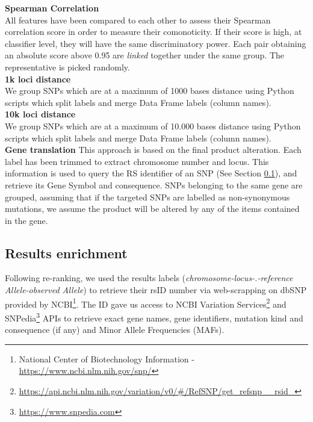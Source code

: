 \textbf{Spearman Correlation}\\
All features have been compared to each other to assess their Spearman correlation score in order to measure their comonoticity. If their score is high, at classifier level, they will have the same discriminatory power. Each pair obtaining an absolute score above 0.95 are \emph{linked} together under the same group. The representative is picked randomly.
\\

\textbf{1k loci distance}\\
We group SNPs which are at a maximum of 1000 bases distance using Python scripts which split labels and merge Data Frame labels (column names).
\\

\textbf{10k loci distance}\\
We group SNPs which are at a maximum of 10.000 bases distance using Python scripts which split labels and merge Data Frame labels (column names).
\\

\textbf{Gene translation}
This approach is based on the final product alteration. Each label has been trimmed to extract chromosome number and locus. This information is used to query the RS identifier of an SNP (See Section \ref{section:rsid}), and retrieve its Gene Symbol and consequence. SNPs belonging to the same gene are grouped, assuming that if the targeted SNPs are labelled as non-synonymous mutations, we assume the product will be altered by any of the items contained in the gene.
\\

\subsection{Results enrichment}
\label{section:rsid}
Following re-ranking, we used the results labels (\emph{chromosome-locus-.-reference Allele-observed Allele}) to retrieve their rsID number via web-scrapping on dbSNP provided by NCBI\footnote{National Center of Biotechnology Information - \url{https://www.ncbi.nlm.nih.gov/snp/}}. The ID gave us access to NCBI Variation Services\footnote{\url{https://api.ncbi.nlm.nih.gov/variation/v0/#/RefSNP/get_refsnp__rsid_}} and SNPedia\footnote{\url{https://www.snpedia.com}} APIs to retrieve exact gene names, gene identifiers, mutation kind and consequence (if any) and Minor Allele Frequencies (MAFs).

